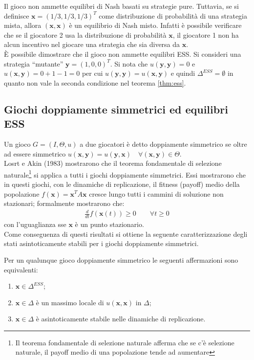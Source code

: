 Il gioco non ammette equilibri di Nash basati su strategie pure. Tuttavia, se si definisce $\mathbf{x}=(1/3, 1/3, 1/3)^T$ come distribuzione di probabilità di una strategia mista, allora $(\mathbf{x}, \mathbf{x})$ è un equilibrio di Nash misto. Infatti è possibile verificare che se il giocatore 2 usa la distribuzione di probabilità $\mathbf{x}$, il giocatore 1 non ha alcun incentivo nel giocare una strategia che sia diversa da $\mathbf{x}$. \\

È possibile dimostrare che il gioco non ammette equilibri ESS. Si consideri una strategia “mutante” $\mathbf{y} = (1, 0, 0)^T$. Si nota che $u(\mathbf{y},\mathbf{y}) = 0$ e $u(\mathbf{x}, \mathbf{y}) = 0 + 1 - 1 = 0$ per cui $u(\mathbf{y}, \mathbf{y}) = u(\mathbf{x}, \mathbf{y})$ e quindi $\Delta^{ESS} = \emptyset$ in quanto non vale la seconda condizione nel teorema \ref{thm:ess}.

\subsection{Giochi doppiamente simmetrici ed equilibri ESS} %
\label{sub:giochi_doppiamente_simmetrici_ed_equilibri_ess}

Un gioco $G= (I, \Theta, u)$ a due giocatori è detto doppiamente simmetrico se oltre ad essere simmetrico $u(\mathbf{x}, \mathbf{y}) = u(\mathbf{y}, \mathbf{x}) \quad \forall(\mathbf{x}, \mathbf{y}) \in \Theta$.\\
Losrt e Akin (1983) mostrarono che il teorema fondamentale di selezione naturale\footnote{Il teorema fondamentale di selezione naturale afferma che se c'è selezione naturale, il payoff medio di una popolazione tende ad aumentare} si applica a tutti i giochi doppiamente simmetrici. Essi mostrarono che in questi giochi, con le dinamiche di replicazione, il fitness (payoff) medio della popolazione  $f(\mathbf{x}) = \mathbf{x}^T A \mathbf{x}$  cresce lungo tutti i cammini di soluzione non stazionari; formalmente mostrarono che:
\begin{align*}
    \frac{d}{dt} f(\mathbf{x}(t)) \geq 0 \qquad \forall t \geq 0
\end{align*}
con l’uguaglianza sse $\mathbf{x}$ è un punto stazionario.\\
Come conseguenza di questi risultati si ottiene la seguente caratterizzazione degli stati asintoticamente stabili per i giochi doppiamente simmetrici.

\begin{prop}
    Per un qualunque gioco doppiamente simmetrico le seguenti affermazioni sono equivalenti:
    \begin{enumerate}
        \item $\mathbf{x} \in \Delta^{ESS}$;
        \item $\mathbf{x} \in \Delta$ è un massimo locale di $u(\mathbf{x}, \mathbf{x})$ in $\Delta$;
        \item $\mathbf{x} \in \Delta$ è asintoticamente stabile nelle dinamiche di replicazione.
    \end{enumerate}
\end{prop}


